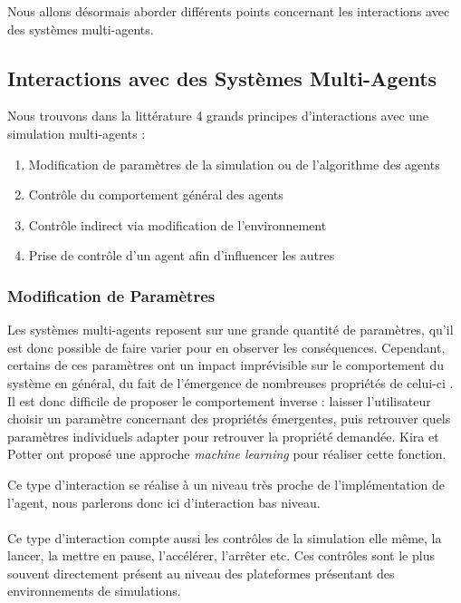 		Nous allons désormais aborder différents points concernant les interactions avec des systèmes multi-agents.
		
		\subsection{Interactions avec des Systèmes Multi-Agents}
	
	
		Nous trouvons dans la littérature 4 grands principes d'interactions avec une simulation multi-agents \cite{kolling_human_2016} :
		\begin{enumerate}
			\item Modification de paramètres de la simulation ou de l'algorithme des agents
			\item Contrôle du comportement général des agents
			\item Contrôle indirect via modification de l'environnement
			\item Prise de contrôle d'un agent afin d'influencer les autres
		\end{enumerate}
		
		
	\subsubsection{Modification de Paramètres}
	Les systèmes multi-agents reposent sur une grande quantité de paramètres, qu'il est donc possible de faire varier pour en observer les conséquences. Cependant, certains de ces paramètres ont un impact imprévisible sur le comportement du système en général, du fait de l'émergence de nombreuses propriétés de celui-ci \cite{couzin_collective_2002}. Il est donc difficile de proposer le comportement inverse : laisser l'utilisateur choisir un paramètre concernant des propriétés émergentes, puis retrouver quels paramètres individuels adapter pour retrouver la propriété demandée. Kira et Potter \cite{kira_exerting_2009} ont proposé une approche \textit{machine learning} pour réaliser cette fonction.
	
	Ce type d'interaction se réalise à un niveau très proche de l'implémentation de l'agent, nous parlerons donc ici d'interaction bas niveau.
	
	\paragraph{}
	Ce type d'interaction compte aussi les contrôles de la simulation elle même, la lancer, la mettre en pause, l'accélérer, l'arrêter etc. Ces contrôles sont le plus souvent directement présent au niveau des plateformes présentant des environnements de simulations.
		
